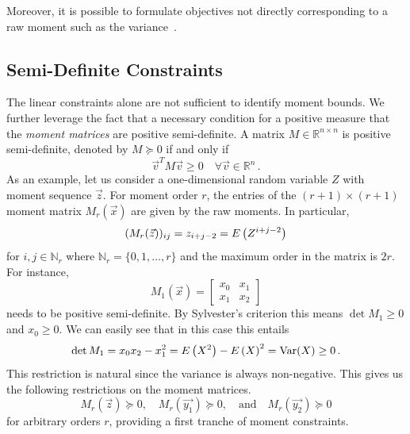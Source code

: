 Moreover, it is possible to formulate objectives not directly corresponding to
a raw moment such as the variance~\cite{sakurai2019bounding,dowdy2018bounds}.

\subsection{Semi-Definite Constraints}
The linear constraints alone are not sufficient to identify moment bounds.
We further leverage the fact that a necessary condition for a positive measure that the \emph{moment matrices}
are positive semi-definite.
A matrix $M\in\mathbb{R}^{n\times n}$ is positive semi-definite, denoted by  $M\succeq 0$ if and only if
$$ {\vec v}^T M{\vec v} \geq 0\quad \forall \vec v\in\mathbb{R}^n\,.$$
As an example, let us consider a one-dimensional random variable $Z$
with moment sequence $\vec z$.
For  moment order $r$,
the entries of the $(r+1)\times (r+1)$ moment matrix $M_r(\vec x)$ are given by
the raw moments.
In particular, $$(M_r({\vec{z}}))_{ij}=z_{i+j-2}={E}\left(Z^{i+j-2}\right)$$ for
$i,j\in\mathbb{N}_r$ where $\mathbb{N}_r=\{0,1,\dots,r\}$ and the maximum order in the matrix is $2r$.
For instance,
\begin{equation}
\label{eq:m1_dim}
    M_1(\vec x) =
    \begin{bmatrix}
    x_0 & x_1 \\
    x_1 & x_2
    \end{bmatrix}
\end{equation}
needs to be positive semi-definite. By Sylvester's criterion this means $\det
M_1\geq 0$ and $x_0\geq 0$.
We can easily see that in this case this entails
$$
\det M_1=x_0x_2 - x_1^2={E}\left(X^2\right)-{E}\left(X\right)^2
=\mathrm{Var}({X})
\geq 0\,.
$$
This restriction is natural since the variance is always non-negative.
This gives us the following restrictions on the moment matrices.
\begin{equation}\label{eq:sd_constraints}
M_r(\vec{z})\succeq 0, \quad M_r(\vec{y_1})\succeq 0,\quad\text{and}\quad M_r(\vec{y_2})\succeq 0
\end{equation}
for arbitrary orders $r$, providing a first tranche of moment constraints.

